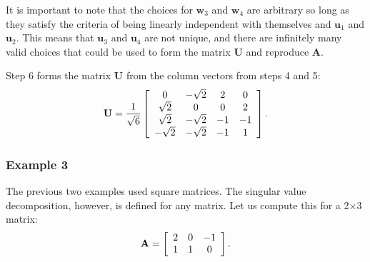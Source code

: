 It is important to note that the choices for $\mathbf{w}_3$ and $\mathbf{w}_4$ are arbitrary so long as they satisfy the criteria of being linearly independent with themselves and $\mathbf{u}_1$ and $\mathbf{u}_2$. This means that $\mathbf{u}_3$ and $\mathbf{u}_4$ are not unique, and there are infinitely many valid choices that could be used to form the matrix $\mathbf{U}$ and reproduce $\mathbf{A}$.

Step 6 forms the matrix $\mathbf{U}$ from the column vectors from steps 4 and 5:
\begin{align}
  \mathbf{U} = \frac{1}{\sqrt{6}} \left[ \begin{array}{c c c c}
   0 		& -\sqrt{2} &  2 &  0 \\
   \sqrt{2} &  0	 	&  0 &  2 \\
   \sqrt{2} & -\sqrt{2} & -1 & -1 \\
  -\sqrt{2} & -\sqrt{2} & -1 &  1 \\ \end{array} \right] .
\end{align}

\subsubsection{Example 3}

The previous two examples used square matrices. The singular value decomposition, however, is defined for any matrix. Let us compute this for a 2$\times$3 matrix:
\begin{align}
  \mathbf{A} = \left[ \begin{array}{c c c}
   2 &  0 & -1 \\
   1 &  1 &  0 \\ \end{array} \right] .
\end{align}

